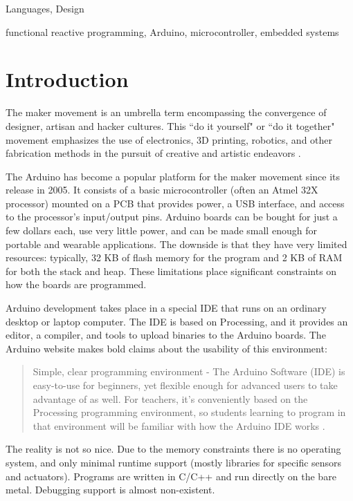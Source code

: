 \documentclass{sigplanconf}
\begin{document}
\terms
Languages, Design

\keywords
functional reactive programming, Arduino, microcontroller, embedded systems

\section{Introduction}

The maker movement is an umbrella term encompassing the convergence of designer, artisan and hacker cultures. This ``do it yourself" or ``do it together" movement emphasizes the use of electronics, 3D printing, robotics, and other fabrication methods in the pursuit of creative and artistic endeavors \citep{ghalim2013fabbing}.

The Arduino has become a popular platform for the maker movement since its release in 2005. It consists of a basic microcontroller (often an Atmel 32X processor) mounted on a PCB that provides power, a USB interface, and access to the processor's input/output pins. Arduino boards can be bought for just a few dollars each, use very little power, and can be made small enough for portable and wearable applications. The downside is that they have very limited resources: typically, 32 KB of flash memory for the program and 2 KB of RAM for both the stack and heap. These limitations place significant constraints on how the boards are programmed.

Arduino development takes place in a special IDE that runs on an ordinary desktop or laptop computer. The IDE is based on Processing, and it provides an editor, a compiler, and tools to upload binaries to the Arduino boards. The Arduino website makes bold claims about the usability of this environment:

\begin{quotation}
Simple, clear programming environment - The Arduino Software (IDE) is easy-to-use for beginners, yet flexible enough for advanced users to take advantage of as well. For teachers, it's conveniently based on the Processing programming environment, so students learning to program in that environment will be familiar with how the Arduino IDE works \citep{arduinowebsite}.
\end{quotation}

\noindent
The reality is not so nice. Due to the memory constraints there is no operating system, and only minimal runtime support (mostly libraries for specific sensors and actuators). Programs are written in C/C++ and run directly on the bare metal. Debugging support is almost non-existent. 
\end{document}
